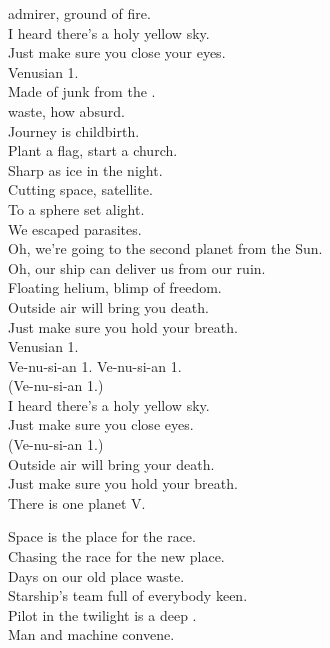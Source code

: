  admirer, ground of fire. \\
I heard there's a holy yellow sky. \\
Just make sure you close your eyes. \\
Venusian 1. \\

Made of junk from the . \\
 waste, how absurd. \\
Journey is childbirth. \\
Plant a flag, start a church. \\
Sharp as ice in the night. \\
Cutting space, satellite. \\
To a sphere set alight. \\
We escaped parasites. \\

Oh, we're going to the second planet from the Sun. \\
Oh, our ship can deliver us from our ruin. \\

Floating helium, blimp of freedom. \\
Outside air will bring you death. \\
Just make sure you hold your breath. \\
Venusian 1. \\

Ve-nu-si-an 1. Ve-nu-si-an 1. \\

(Ve-nu-si-an 1.) \\
I heard there's a holy yellow sky. \\
Just make sure you close eyes. \\

(Ve-nu-si-an 1.) \\
Outside air will bring your death. \\
Just make sure you hold your breath. \\

There is one planet V. \\





Space is the place for the  race. \\
Chasing the race for the new place. \\
Days on our old place waste. \\
Starship's team full of everybody keen. \\
Pilot in the twilight is a deep . \\
Man and machine convene. \\

